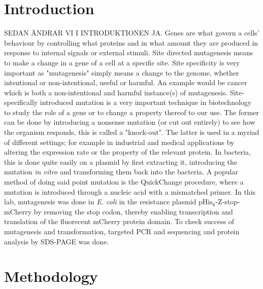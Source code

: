\documentclass[11pt,a4paper]{article}
\begin{document}
\setcounter{page}{1}

\section{Introduction}
SEDAN ÄNDRAR VI I INTRODUKTIONEN JA. Genes are what govern a cells’ behaviour by controlling what proteins and in what amount they are produced  in response to internal signals or external stimuli. Site directed mutagenesis means to make a change in a gene of a cell at a specific site. Site specificity is very important as "mutagenesis" simply means a change to the genome, whether intentional or non-intentional, useful or harmful. An example would be cancer which is both a non-intentional and harmful instance(s) of mutagenesis. Site-specifically introduced mutation is a very important technique in biotechnology to study the role of a gene or to change a property thereof to our use. The former can be done by introducing a nonsense mutation (or cut out entirely) to see how the organism responds, this is called a "knock-out". The latter is used in a myriad of different settings; for example in industrial and medical applications by altering the expression rate or the property of the relevant protein. In bacteria, this is done quite easily on a plasmid by first extracting it, introducing the mutation \textit{in vitro} and transforming them back into the bacteria. A popular method of doing said point mutation is the QuickChange procedure, where a mutation is introduced through a nucleic acid with a mismatched primer. In this lab, mutagenesis was done in \textit{E. coli} in the resistance plasmid pHis$_6$-Z-stop-mCherry by removing the stop codon, thereby enabling transcription and translation of the fluorecent mCherry protein domain. To check success of mutagenesis and transformation, targeted PCR and sequencing and protein analysis by SDS-PAGE was done. 
\section{Methodology}
\end{document}
